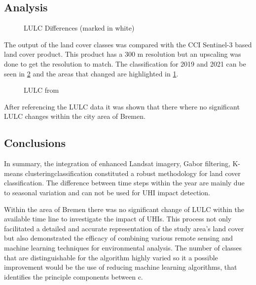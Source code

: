 \documentclass[12pt,a4paper, english,twoside]{article}
\begin{document}
 \subsection{Analysis}\label{sec:landcoverAnalysis} 
     \begin{figure}
     \centering
          
        \caption{LULC Differences (marked in white)\label{fig:ccidiff}}
   \end{figure}
      The output of the land cover classes was compared with the CCI Sentinel-3 based land cover product. 
      This product has a 300 m resolution but an upscaling was done to get the resolution to match. 
      The classification for 2019 and 2021 can be seen in \cref{fig:cciclasses} and the areas that changed are highlighted in \cref{fig:ccidiff}. 
      \begin{figure}[!htbp]
       \centering
          \begin{subfigure}[b]{0.45\textwidth}
            
          \end{subfigure}
          \begin{subfigure}[b]{0.45\textwidth}
            
          \end{subfigure}
          \caption{LULC from~\cite{CCCS2019}\label{fig:cciclasses}}
      \end{figure}

      After referencing the LULC data it was shown that there where no significant LULC changes within the city area of Bremen.  
      
 \subsection{Conclusions}
    In summary, the integration of enhanced Landsat imagery, Gabor filtering, K-means clusteringclassification constituted a robust methodology for land cover classification.
    The difference between time steps within the year are mainly due to seasonal variation and can not be used for UHI impact detection. 

    Within the area of Bremen there was no significant change of LULC within the available time line to investigate the impact of \glspl{UHI}.
    This process not only facilitated a detailed and accurate representation of the study area's land cover but also demonstrated the efficacy of combining various remote sensing and machine learning techniques for environmental analysis.
    The number of classes that are distinguishable for the algorithm highly varied so it a possible improvement would be the use of reducing machine learning algorithms, that identifies the principle components between c.
    
\end{document}
